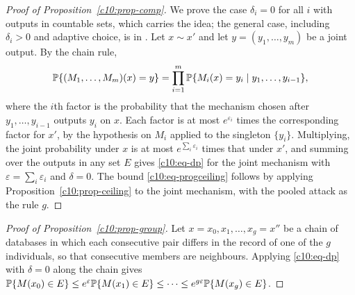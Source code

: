 \begin{proof}[Proof of Proposition~\ref{c10:prop-comp}]
We prove the case $\delta_i = 0$ for all $i$ with outputs in countable sets, which
carries the idea; the general case, including $\delta_i > 0$ and adaptive choice,
is in \citet[ch.~3]{dwork2014}. Let $x \sim x'$ and let
$y = (y_1,\dots,y_m)$ be a joint output. By the chain rule,
\[
\mathbb{P}\{(M_1,\dots,M_m)(x) = y\}
= \prod_{i=1}^m \mathbb{P}\{M_i(x) = y_i \mid y_1,\dots,y_{i-1}\},
\]
where the $i$th factor is the probability that the mechanism chosen after
$y_1,\dots,y_{i-1}$ outputs $y_i$ on $x$. Each factor is at most $e^{\varepsilon_i}$
times the corresponding factor for $x'$, by the hypothesis on $M_i$ applied to the
singleton $\{y_i\}$. Multiplying, the joint probability under $x$ is at most
$e^{\sum_i \varepsilon_i}$ times that under $x'$, and summing over the outputs in
any set $E$ gives \eqref{c10:eq-dp} for the joint mechanism with
$\varepsilon = \sum_i\varepsilon_i$ and $\delta = 0$. The bound
\eqref{c10:eq-progceiling} follows by applying Proposition~\ref{c10:prop-ceiling}
to the joint mechanism, with the pooled attack as the rule $g$.
\end{proof}

\begin{proof}[Proof of Proposition~\ref{c10:prop-group}]
Let $x = x_0, x_1, \dots, x_g = x''$ be a chain of databases in which each
consecutive pair differs in the record of one of the $g$ individuals, so that
consecutive members are neighbours. Applying \eqref{c10:eq-dp} with $\delta = 0$
along the chain gives
$\mathbb{P}\{M(x_0) \in E\} \le e^{\varepsilon}\mathbb{P}\{M(x_1) \in E\} \le \dots
\le e^{g\varepsilon}\mathbb{P}\{M(x_g) \in E\}$.
\end{proof}
